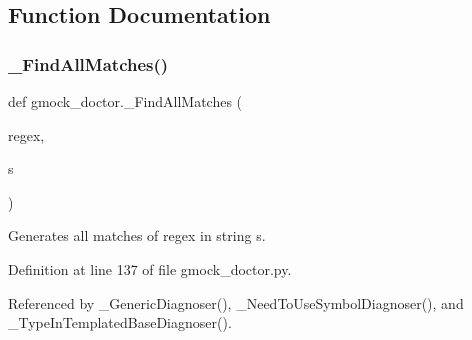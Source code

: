 \subsection{Function Documentation}
\mbox{\label{namespacegmock__doctor_af9f6b7d876afcfe52864f2b928f5e6ab}} 
\subsubsection{\texorpdfstring{\+\_\+\+Find\+All\+Matches()}{\_FindAllMatches()}}
{\footnotesize\ttfamily def gmock\+\_\+doctor.\+\_\+\+Find\+All\+Matches (\begin{DoxyParamCaption}\item[{}]{regex,  }\item[{}]{s }\end{DoxyParamCaption})\hspace{0.3cm}{\ttfamily [private]}}

\begin{DoxyVerb}Generates all matches of regex in string s.\end{DoxyVerb}
 

Definition at line 137 of file gmock\+\_\+doctor.\+py.



Referenced by \+\_\+\+Generic\+Diagnoser(), \+\_\+\+Need\+To\+Use\+Symbol\+Diagnoser(), and \+\_\+\+Type\+In\+Templated\+Base\+Diagnoser().


